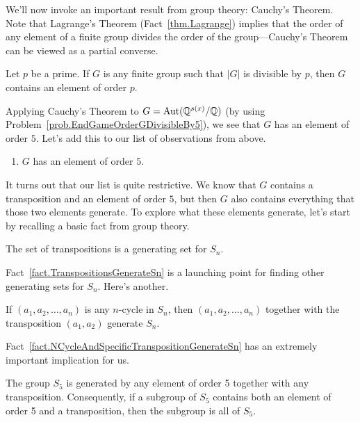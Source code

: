 We'll now invoke an important result from group theory: Cauchy's Theorem. Note that Lagrange's Theorem (Fact~\ref{thm.Lagrange}) implies that the order of any element of a finite group  divides the order of the group---Cauchy's Theorem can be viewed as a partial converse.

\begin{fact}
Let $p$ be a prime. If $G$ is any finite group such that $|G|$ is divisible by $p$, then  $G$ contains an element of order $p$.
\end{fact}

Applying Cauchy's Theorem to $G = \operatorname{Aut}(\mathbb{Q}^{s(x)}/\mathbb{Q})$ (by using Problem~\ref{prob.EndGameOrderGDivisibleBy5}), we see that $G$ has an element of order $5$. Let's add this to our list of observations from above.

\begin{enumerate}[start = 3, label = \textbf{\Roman*.}]
\item $G$ has an element of order $5$.
\end{enumerate}

It turns out that our list is quite restrictive. We know that $G$ contains a transposition and an element of order $5$, but then $G$ also contains everything that those two elements generate. To explore what these elements generate, let's start by recalling  a basic fact from group theory. 

\begin{fact}\label{fact.TranspositionsGenerateSn}
The set of transpositions is a generating set for $S_n$. 
\end{fact}

Fact~\ref{fact.TranspositionsGenerateSn} is a launching point for finding other generating sets for $S_n$. Here's another.

\begin{fact}\label{fact.NCycleAndSpecificTranspositionGenerateSn}
If $(a_1,a_2,\ldots,a_n)$ is any $n$-cycle in $S_n$, then $(a_1,a_2,\ldots,a_n)$ together with the transposition $(a_1,a_2)$ generate $S_n$.
\end{fact}

Fact~\ref{fact.NCycleAndSpecificTranspositionGenerateSn} has an extremely important implication for us.

\begin{theorem}\label{thm.TranspositionAndOrder5GenerateS5}
The group $S_5$ is generated by any element of order 5 together with any transposition. Consequently, if a subgroup of $S_5$ contains both an element of order 5 and a transposition, then the subgroup is all of $S_5$.
\end{theorem}


